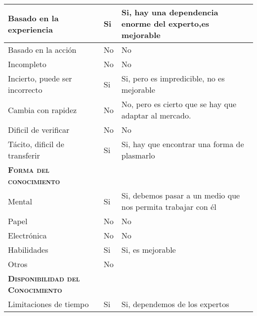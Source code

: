 \begin{table}[H]
{\begin{tabular}{|l|l|l|}
		Basado en la experiencia & \multicolumn{1}{p{1.0cm}|}{Si} & \multicolumn{1}{p{13.0cm}|}{Si, hay una dependencia enorme del experto,es mejorable}\\
		\hline

		Basado en la acción & \multicolumn{1}{p{1.0cm}|}{No} & \multicolumn{1}{p{13.0cm}|}{No}\\
		\hline

		Incompleto & \multicolumn{1}{p{1.0cm}|}{No} & \multicolumn{1}{p{13.0cm}|}{No}\\
		\hline

		Incierto, puede ser incorrecto & \multicolumn{1}{p{1.0cm}|}{Si} & \multicolumn{1}{p{13.0cm}|}{Si, pero es impredicible, no es mejorable}\\
		\hline

		Cambia con rapidez & \multicolumn{1}{p{1.0cm}|}{No} & \multicolumn{1}{p{13.0cm}|}{No, pero es cierto que se hay que adaptar al mercado.}\\
		\hline

		Dificil de verificar & \multicolumn{1}{p{1.0cm}|}{No} & \multicolumn{1}{p{13.0cm}|}{No}\\
		\hline

		Tácito, dificil de transferir& \multicolumn{1}{p{1.0cm}|}{Si} & \multicolumn{1}{p{13.0cm}|}{Si, hay que encontrar una forma de plasmarlo}\\
		\hline

		\textsc {\textbf{Forma del conocimiento}}& \multicolumn{1}{p{1.0cm}|}{} & \multicolumn{1}{p{13.0cm}|}{}\\
		\hline

		Mental & \multicolumn{1}{p{1.0cm}|}{Si} & \multicolumn{1}{p{13.0cm}|}{Si, debemos pasar a un medio que nos permita trabajar con él}\\
		\hline

		Papel & \multicolumn{1}{p{1.0cm}|}{No} & \multicolumn{1}{p{13.0cm}|}{No}\\
		\hline

		Electrónica & \multicolumn{1}{p{1.0cm}|}{No} & \multicolumn{1}{p{13.0cm}|}{No}\\
		\hline

		Habilidades & \multicolumn{1}{p{1.0cm}|}{Si} & \multicolumn{1}{p{13.0cm}|}{Si, es mejorable}\\
		\hline

		Otros & \multicolumn{1}{p{1.0cm}|}{No} & \multicolumn{1}{p{13.0cm}|}{}\\
		\hline

		\textsc {\textbf{Disponibilidad del Conocimiento}} & \multicolumn{1}{p{1.0cm}|}{} & \multicolumn{1}{p{13.0cm}|}{}\\
		\hline
		Limitaciones de tiempo& \multicolumn{1}{p{1.0cm}|}{Si} & \multicolumn{1}{p{13.0cm}|}{Si, dependemos de los expertos}\\
		\hline


\end{tabular}}
\end{table}
